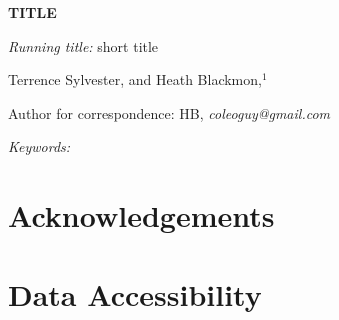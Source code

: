 \documentclass[12pt]{article}
\begin{document}
\linenumbers


\begin{center}
\textbf{TITLE}
\end{center}

\vfill
\noindent
\textit{Running title:} short title


\vfill
\noindent
Terrence Sylvester,
%
\noindent
and
Heath Blackmon,$^1$
\vfill


\theendnotes
\noindent
Author for correspondence: HB, \textit{coleoguy@gmail.com}
\vfill

\clearpage

 
\bigskip
\noindent
\textit{Keywords: }


\clearpage





\section{Acknowledgements}




\section{Data Accessibility}





\clearpage




\nolinenumbers
\clearpage

% 
\clearpage

\end{document}
